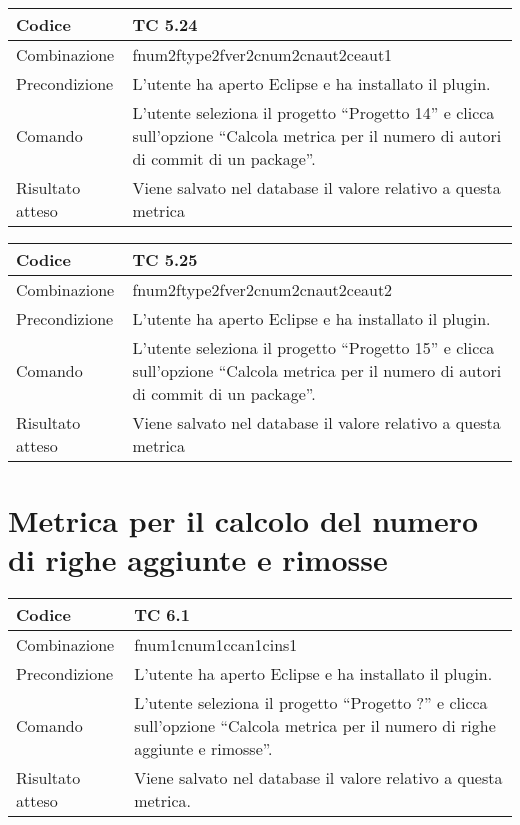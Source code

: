 \begin{table}[ht]
\begin{tabular}{|p{3cm}|p{9cm}|}
\hline
\cellcolor{lightgray}Codice				& TC 5.24								\\
\hline
\cellcolor{lightgray}Combinazione		& fnum2ftype2fver2cnum2cnaut2ceaut1								\\
\hline
\cellcolor{lightgray}Precondizione		& L'utente ha aperto Eclipse e ha installato il plugin.			\\
\hline
\cellcolor{lightgray}Comando			& L'utente seleziona il progetto ``Progetto 14''  e clicca sull'opzione ``Calcola metrica per il numero di autori di commit di un package''.	\\
\hline
\cellcolor{lightgray}Risultato atteso	& Viene salvato nel database il valore relativo a questa metrica	\\
\hline
\end{tabular}
\end{table}

\begin{table}[ht]
\begin{tabular}{|p{3cm}|p{9cm}|}
\hline
\cellcolor{lightgray}Codice				& TC 5.25								\\
\hline
\cellcolor{lightgray}Combinazione		& fnum2ftype2fver2cnum2cnaut2ceaut2 									\\
\hline
\cellcolor{lightgray}Precondizione		& L'utente ha aperto Eclipse e ha installato il plugin.			\\
\hline
\cellcolor{lightgray}Comando			& L'utente seleziona il progetto ``Progetto 15''  e clicca sull'opzione ``Calcola metrica per il numero di autori di commit di un package''.	\\
\hline
\cellcolor{lightgray}Risultato atteso	& Viene salvato nel database il valore relativo a questa metrica	\\
\hline
\end{tabular}
\end{table}

\clearpage

\section{Metrica per il calcolo del numero di righe aggiunte e rimosse}

\begin{table}[ht]
\begin{tabular}{|p{3cm}|p{9cm}|}
\hline
\cellcolor{lightgray}Codice				& TC 6.1								\\
\hline
\cellcolor{lightgray}Combinazione		& fnum1cnum1ccan1cins1									\\
\hline
\cellcolor{lightgray}Precondizione		& L'utente ha aperto Eclipse e ha installato il plugin.		\\
\hline
\cellcolor{lightgray}Comando			& L'utente seleziona il progetto ``Progetto ?''  e clicca sull'opzione ``Calcola metrica per il numero di righe aggiunte e rimosse''.	\\
\hline
\cellcolor{lightgray}Risultato atteso	& Viene salvato nel database il valore relativo a questa metrica.\\
\hline
\end{tabular}
\end{table}

